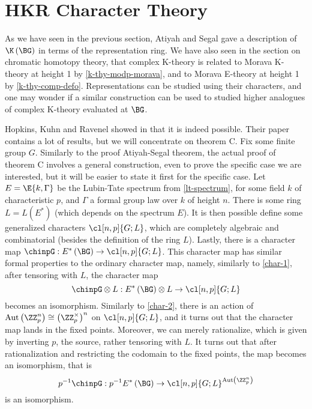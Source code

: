 \section{HKR Character Theory}

As we have seen in the previous section, Atiyah and Segal gave a description of $\K\left(\BG\right)$ in terms of the representation ring.
We have also seen in the section on chromatic homotopy theory, that complex K-theory is related to Morava K-theory at height 1 by \ref{k-thy-modp-morava}, and to Morava E-theory at height 1 by \ref{k-thy-comp-defo}.
Representations can be studied using their characters, and one may wonder if a similar construction can be used to studied higher analogues of complex K-theory evaluated at $\BG$.

Hopkins, Kuhn and Ravenel showed in \cite{HKR} that it is indeed possible.
Their paper contains a lot of results, but we will concentrate on theorem C.
Fix some finite group $G$.
Similarly to the proof Atiyah-Segal theorem, the actual proof of theorem C involves a general construction, even to prove the specific case we are interested, but it will be easier to state it first for the specific case.
Let $E = \E{k, \Gamma}$ be the Lubin-Tate spectrum from \ref{lt-spectrum}, for some field $k$ of characteristic $p$, and $\Gamma$ a formal group law over $k$ of height $n$. 
There is some ring $L = L\left(E^*\right)$ (which depends on the spectrum $E$).
It is then possible define some generalized characters $\cl[n,p]{G; L}$, which are completely algebraic and combinatorial (besides the definition of the ring $L$).
Lastly, there is a character map $\chinpG: E^*\left(\BG\right) \to \cl[n,p]{G; L}$.
This character map has similar formal properties to the ordinary character map, namely, similarly to \ref{char-1}, after tensoring with $L$, the character map
$$
\chinpG \otimes L:
E^*\left(\BG\right) \otimes L
\to \cl[n,p]{G; L}
$$
becomes an isomorphism.
Similarly to \ref{char-2}, there is an action of $\aut\left(\ZZ_p^n\right) \cong \left(\ZZ_p^\times\right)^n$ on $\cl[n,p]{G; L}$, and it turns out that the character map lands in the fixed points.
Moreover, we can merely rationalize, which is given by inverting $p$, the source, rather tensoring with $L$.
It turns out that after rationalization and restricting the codomain to the fixed points, the map becomes an isomorphism, that is
$$
p^{-1} \chinpG:
p^{-1} E^*\left(\BG\right)
\to \cl[n,p]{G; L}^{\aut\left(\ZZ_p^n\right)}
$$
is an isomorphism.

